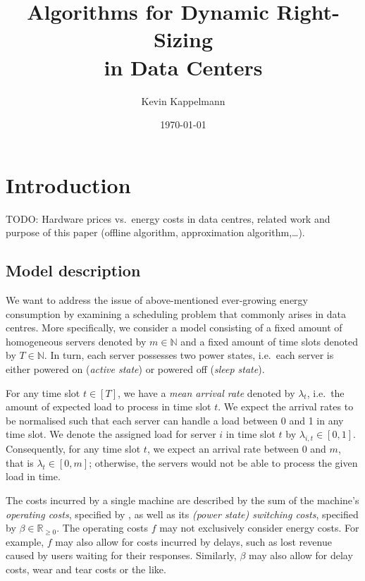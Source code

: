 \documentclass[hidelinks]{article}
\title{\textbf{Algorithms for Dynamic Right-Sizing\\in Data Centers}}
\author{Kevin Kappelmann}
\affil{Chair for Theoretical Computer Science,\\ Technical University of Munich}
\date{\today}
\theoremstyle{plain}
\theoremstyle{definition}
\theoremstyle{rem}
\begin{document}
\maketitle
\newpage
\tableofcontents 
\newpage


\section{Introduction}
TODO: Hardware prices vs.\ energy costs in data centres, related work and purpose of this paper (offline algorithm, approximation algorithm,\ldots).

\subsection{Model description}\label{sec_model_descr}
We want to address the issue of above-mentioned ever-growing energy consumption by examining a scheduling problem that commonly arises in data centres. More specifically, we consider a model consisting of a fixed amount of homogeneous servers denoted by $m\in\mathbb{N}$ and a fixed amount of time slots denoted by $T\in\mathbb{N}$. In turn, each server possesses two power states, i.e.\ each server is either powered on (\textit{active state}) or powered off (\textit{sleep state}).
	
For any time slot $t\in[T]$, we have a \textit{mean arrival rate} denoted by $\lambda_t$, i.e.\ the amount of expected load to process in time slot $t$. We expect the arrival rates to be normalised such that each server can handle a load between 0 and 1 in any time slot. We denote the assigned load for server $i$ in time slot $t$ by $\lambda_{i,t}\in[0,1]$. Consequently, for any time slot $t$, we expect an arrival rate between 0 and $m$, that is $\lambda_t\in[0,m]$; otherwise, the servers would not be able to process the given load in time.

The costs incurred by a single machine are described by the sum of the machine's \textit{operating costs}, specified by , as well as its \textit{(power state) switching costs}, specified by $\beta\in\mathbb{R}_{\ge 0}$. 
The operating costs $f$ may not exclusively consider energy costs. For example, $f$ may also allow for costs incurred by delays, such as lost revenue caused by users waiting for their responses. Similarly, $\beta$ may also allow for delay costs, wear and tear costs or the like.\cite{dyn_right_size}
\end{document}
